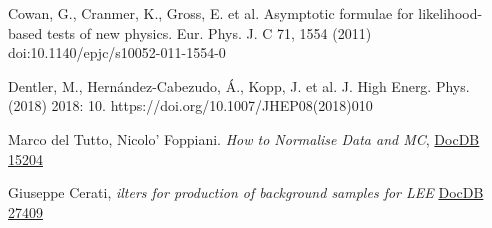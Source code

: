 \documentclass[a4paper]{article}
\begin{document}
\begin{thebibliography}{}
Cowan, G., Cranmer, K., Gross, E. et al. Asymptotic formulae for likelihood-based tests of new physics. Eur. Phys. J. C 71, 1554 (2011) doi:10.1140/epjc/s10052-011-1554-0

Dentler, M., Hernández-Cabezudo, Á., Kopp, J. et al. J. High Energ. Phys. (2018) 2018: 10. https://doi.org/10.1007/JHEP08(2018)010

Marco del Tutto, Nicolo' Foppiani. \emph{How to Normalise Data and MC}, \href{https://microboone-docdb.fnal.gov/cgi-bin/private/ShowDocument?docid=15204}{DocDB 15204}

Giuseppe Cerati, \emph{ilters for production of background samples for LEE} \href{https://microboone-docdb.fnal.gov/cgi-bin/private/ShowDocument?docid=27409}{DocDB 27409}

\end{thebibliography}
\end{document}
